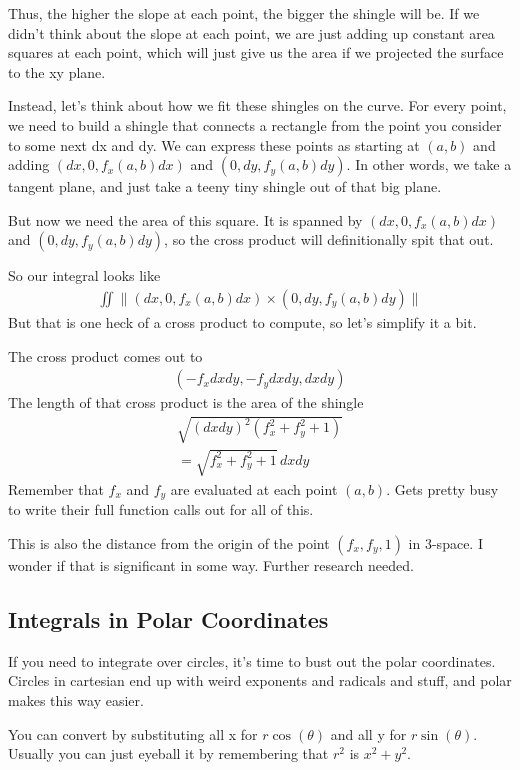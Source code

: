 \documentclass[12pt, letterpaper]{article}
\begin{document}
Thus, the higher the slope at each point, the bigger the shingle will be. 
If we didn't think about the slope at each point, we are just adding up constant area squares at each point, which will just give us the area if we projected the surface to the xy plane.

Instead, let's think about how we fit these shingles on the curve.
For every point, we need to build a shingle that connects a rectangle from the point you consider to some next dx and dy.
We can express these points as starting at $(a, b)$ and adding $(dx, 0, f_{x}(a, b)dx)$ and $(0, dy, f_{y}(a, b)dy)$.
In other words, we take a tangent plane, and just take a teeny tiny shingle out of that big plane.

But now we need the area of this square.
It is spanned by $(dx, 0, f_{x}(a, b)dx)$ and $(0, dy, f_{y}(a, b)dy)$, so the cross product will definitionally spit that out.

So our integral looks like 
\begin{gather*}
\iint \lVert(dx, 0, f_{x}(a, b)dx) \times (0, dy, f_{y}(a, b)dy)\rVert    
\end{gather*}
But that is one heck of a cross product to compute, so let's simplify it a bit.

The cross product comes out to 
\begin{gather*}
    (-f_x dxdy, -f_ydxdy, dxdy)
\end{gather*}
The length of that cross product is the area of the shingle
\begin{gather*}
    \sqrt{(dxdy)^2(f_x^2 + f_y^2 + 1)}\\
    = \sqrt{f_x^2 + f_y^2 + 1}\,dxdy
\end{gather*}
Remember that $f_{x}$ and $f_y$ are evaluated at each point $(a, b)$. 
Gets pretty busy to write their full function calls out for all of this.

This is also the distance from the origin of the point $(f_x, f_y, 1)$ in 3-space. 
I wonder if that is significant in some way. Further research needed.

\subsection{Integrals in Polar Coordinates}
If you need to integrate over circles, it's time to bust out the polar coordinates.
Circles in cartesian end up with weird exponents and radicals and stuff, and polar makes this way easier.

You can convert by substituting all x for $r\cos(\theta)$ and all y for $r\sin(\theta)$.
Usually you can just eyeball it by remembering that $r^2$ is $x^2 + y^2$.
\end{document}
